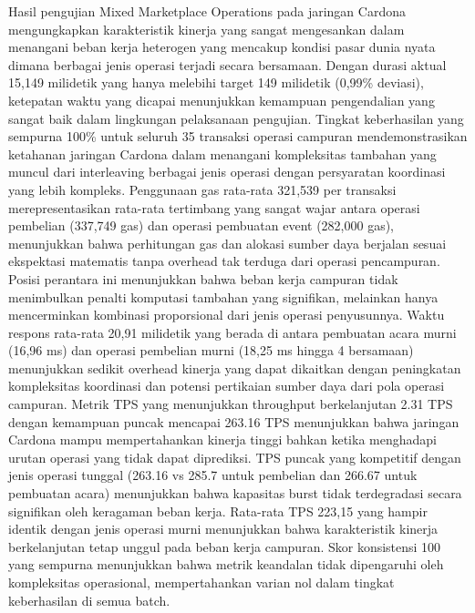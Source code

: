 Hasil pengujian Mixed Marketplace Operations pada jaringan Cardona mengungkapkan karakteristik kinerja yang sangat mengesankan dalam menangani beban kerja heterogen yang mencakup kondisi pasar dunia nyata dimana berbagai jenis operasi terjadi secara bersamaan. Dengan durasi aktual 15,149 milidetik yang hanya melebihi target 149 milidetik (0,99\% deviasi), ketepatan waktu yang dicapai menunjukkan kemampuan pengendalian yang sangat baik dalam lingkungan pelaksanaan pengujian. Tingkat keberhasilan yang sempurna 100\% untuk seluruh 35 transaksi operasi campuran mendemonstrasikan ketahanan jaringan Cardona dalam menangani kompleksitas tambahan yang muncul dari interleaving berbagai jenis operasi dengan persyaratan koordinasi yang lebih kompleks.
Penggunaan gas rata-rata 321,539 per transaksi merepresentasikan rata-rata tertimbang yang sangat wajar antara operasi pembelian (337,749 gas) dan operasi pembuatan event (282,000 gas), menunjukkan bahwa perhitungan gas dan alokasi sumber daya berjalan sesuai ekspektasi matematis tanpa overhead tak terduga dari operasi pencampuran. Posisi perantara ini menunjukkan bahwa beban kerja campuran tidak menimbulkan penalti komputasi tambahan yang signifikan, melainkan hanya mencerminkan kombinasi proporsional dari jenis operasi penyusunnya. Waktu respons rata-rata 20,91 milidetik yang berada di antara pembuatan acara murni (16,96 ms) dan operasi pembelian murni (18,25 ms hingga 4 bersamaan) menunjukkan sedikit overhead kinerja yang dapat dikaitkan dengan peningkatan kompleksitas koordinasi dan potensi pertikaian sumber daya dari pola operasi campuran.
Metrik TPS yang menunjukkan throughput berkelanjutan 2.31 TPS dengan kemampuan puncak mencapai 263.16 TPS menunjukkan bahwa jaringan Cardona mampu mempertahankan kinerja tinggi bahkan ketika menghadapi urutan operasi yang tidak dapat diprediksi. TPS puncak yang kompetitif dengan jenis operasi tunggal (263.16 vs 285.7 untuk pembelian dan 266.67 untuk pembuatan acara) menunjukkan bahwa kapasitas burst tidak terdegradasi secara signifikan oleh keragaman beban kerja. Rata-rata TPS 223,15 yang hampir identik dengan jenis operasi murni menunjukkan bahwa karakteristik kinerja berkelanjutan tetap unggul pada beban kerja campuran. Skor konsistensi 100 yang sempurna menunjukkan bahwa metrik keandalan tidak dipengaruhi oleh kompleksitas operasional, mempertahankan varian nol dalam tingkat keberhasilan di semua batch.

